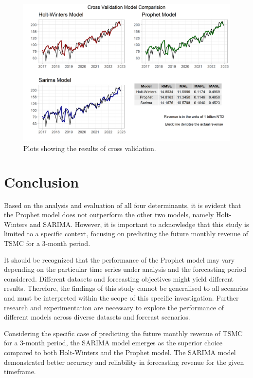 \documentclass[
]{article}
\begin{document}
\begin{figure}
\centering
\includegraphics{Plots/CrossValidation.png}
\caption{Plots showing the results of cross validation.}
\end{figure}

\newpage

\hypertarget{conclusion}{%
\section{Conclusion}\label{conclusion}}

Based on the analysis and evaluation of all four determinants, it is
evident that the Prophet model does not outperform the other two models,
namely Holt-Winters and SARIMA. However, it is important to acknowledge
that this study is limited to a specific context, focusing on predicting
the future monthly revenue of TSMC for a 3-month period.

It should be recognized that the performance of the Prophet model may
vary depending on the particular time series under analysis and the
forecasting period considered. Different datasets and forecasting
objectives might yield different results. Therefore, the findings of
this study cannot be generalised to all scenarios and must be
interpreted within the scope of this specific investigation. Further
research and experimentation are necessary to explore the performance of
different models across diverse datasets and forecast scenarios.

Considering the specific case of predicting the future monthly revenue
of TSMC for a 3-month period, the SARIMA model emerges as the superior
choice compared to both Holt-Winters and the Prophet model. The SARIMA
model demonstrated better accuracy and reliability in forecasting
revenue for the given timeframe.
\end{document}
